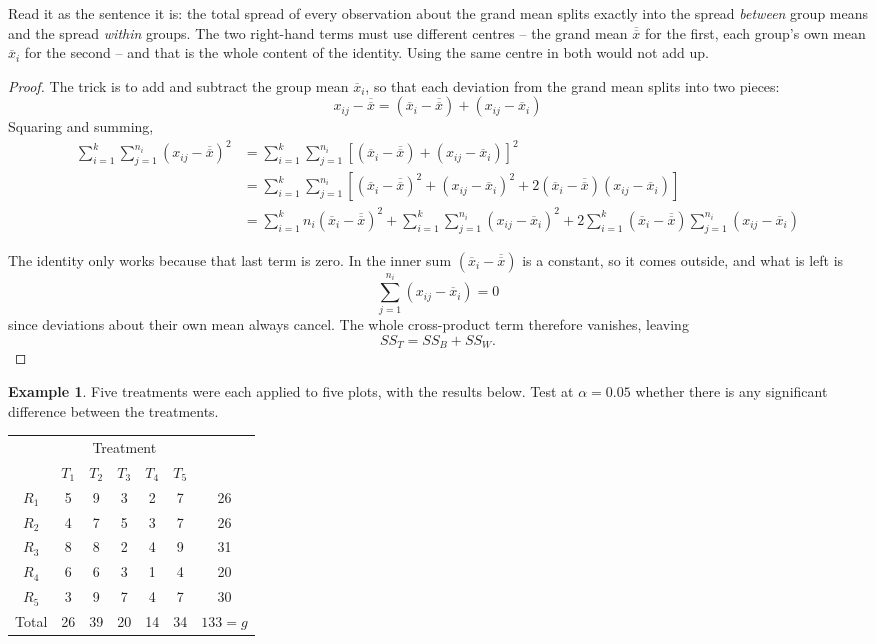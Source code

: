 \documentclass[11pt,a4paper]{article}
\theoremstyle{definition}
\newtheorem{example}[thm]{Example}
\begin{document}
Read it as the sentence it is: the total spread of every observation about the grand mean
splits exactly into the spread \emph{between} group means and the spread \emph{within}
groups. The two right-hand terms must use different centres -- the grand mean
$\overline{\overline{x}}$ for the first, each group's own mean $\overline{x}_i$ for the
second -- and that is the whole content of the identity. Using the same centre in both
would not add up.




\begin{proof}
The trick is to add and subtract the group mean $\overline{x}_i$, so that each deviation
from the grand mean splits into two pieces:
\[x_{ij}-\overline{\overline{x}}=(\overline{x}_i-\overline{\overline{x}})+(x_{ij}-\overline{x}_i)\]
Squaring and summing,
\begin{align*}
\sum_{i=1}^k\sum_{j=1}^{n_i}(x_{ij}-\overline{\overline{x}})^2
 &=\sum_{i=1}^k\sum_{j=1}^{n_i}[(\overline{x}_i-\overline{\overline{x}})+(x_{ij}-\overline{x}_i)]^2\\[1ex]
 &=\sum_{i=1}^k\sum_{j=1}^{n_i}[(\overline{x}_i-\overline{\overline{x}})^2+(x_{ij}-\overline{x}_i)^2
   +2(\overline{x}_i-\overline{\overline{x}})(x_{ij}-\overline{x}_i)]\\[1ex]
 &=\sum_{i=1}^k n_i(\overline{x}_i-\overline{\overline{x}})^2+\sum_{i=1}^k\sum_{j=1}^{n_i}(x_{ij}-\overline{x}_i)^2
   +2\sum_{i=1}^k(\overline{x}_i-\overline{\overline{x}})\sum_{j=1}^{n_i}(x_{ij}-\overline{x}_i)
\end{align*}

The identity only works because that last term is zero. In the inner sum
$(\overline{x}_i-\overline{\overline{x}})$ is a constant, so it comes outside, and what is
left is
\[\sum_{j=1}^{n_i}(x_{ij}-\overline{x}_i)=0\]
since deviations about their own mean always cancel. The whole cross-product term
therefore vanishes, leaving
\[SS_T = SS_B + SS_W .\]
\end{proof}

\begin{example}
Five treatments were each applied to five plots, with the results below. Test at
$\alpha = 0.05$ whether there is any significant difference between the treatments.
\begin{table}[H]
\centering
\begin{tabular}{c|ccccc|c}
&\multicolumn{5}{c|}{Treatment} & \\
& $T_1$ & $T_2$ & $T_3$ & $T_4$ & $T_5$ &\\
\hline
$R_1$ & 5&9&3&2&7&26\\
$R_2$ &4&7&5&3&7&26\\
$R_3$ & 8&8&2&4&9&31\\
$R_4$ &6&6&3&1&4&20\\
$R_5$ & 3&9&7&4&7&30\\
\hline
Total &26&39&20&14&34& $133 = g$\\
\end{tabular}
\end{table}
\end{example}
\end{document}
